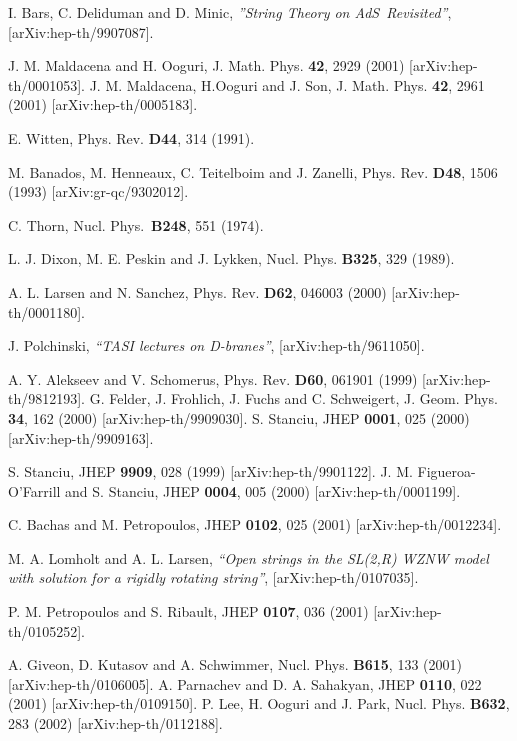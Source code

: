 \documentclass[a4paper,12pt]{article}
\begin{document}
\begin{thebibliography}{99}
  I. Bars, C. Deliduman and D. Minic, \textit{''String Theory
on AdS}\coordHE{}\textit{\ Revisited''}, [arXiv:hep-th/9907087].

  J. M. Maldacena and H. Ooguri,
J. Math. Phys. \textbf{42}, 2929 (2001) [arXiv:hep-th/0001053].\newline
J. M. Maldacena, H.Ooguri and J. Son,
J. Math. Phys. \textbf{42}, 2961 (2001) [arXiv:hep-th/0005183].

  E. Witten, Phys. Rev. \textbf{D44}, 314 (1991).

  M. Banados, M. Henneaux, C. Teitelboim and J. Zanelli,
Phys. Rev. \textbf{D48}, 1506 (1993) [arXiv:gr-qc/9302012].

  C. Thorn, Nucl. Phys.\ \textbf{B248}, 551 (1974).

  L. J. Dixon, M. E. Peskin and J. Lykken, Nucl. Phys.
\textbf{B325}, 329 (1989).

  A. L. Larsen and N. Sanchez,
Phys. Rev. \textbf{D62}, 046003 (2000) [arXiv:hep-th/0001180].

  J. Polchinski, \textit{``TASI lectures on D-branes''},
[arXiv:hep-th/9611050].

  A. Y. Alekseev and V. Schomerus,
Phys. Rev. \textbf{D60}, 061901 (1999) [arXiv:hep-th/9812193]. \newline
G. Felder, J. Frohlich, J. Fuchs and C. Schweigert,
J. Geom. Phys. \textbf{34}, 162 (2000) [arXiv:hep-th/9909030]. \newline
S. Stanciu, %
JHEP \textbf{0001}, 025 (2000) [arXiv:hep-th/9909163].

  S. Stanciu,
JHEP \textbf{9909}, 028 (1999) [arXiv:hep-th/9901122].\newline
J. M. Figueroa-O'Farrill and S. Stanciu,
JHEP \textbf{0004}, 005 (2000) [arXiv:hep-th/0001199].

  C. Bachas and M. Petropoulos,
JHEP \textbf{0102}, 025 (2001) [arXiv:hep-th/0012234].

  M. A. Lomholt and A. L. Larsen, \textit{``Open strings in
the SL(2,R) WZNW model with solution for a rigidly rotating
string''}, [arXiv:hep-th/0107035].

  P. M. Petropoulos and S. Ribault,
JHEP {\bf 0107}, 036 (2001) [arXiv:hep-th/0105252].

 A. Giveon, D. Kutasov and A. Schwimmer,
Nucl. Phys. \textbf{B615}, 133 (2001) [arXiv:hep-th/0106005].
\newline
A. Parnachev and D. A. Sahakyan, %
JHEP \textbf{0110}, 022 (2001) [arXiv:hep-th/0109150]. \newline
P. Lee, H. Ooguri and J. Park,
Nucl. Phys. \textbf{B632}, 283 (2002) [arXiv:hep-th/0112188].


\end{thebibliography}
\end{document}
